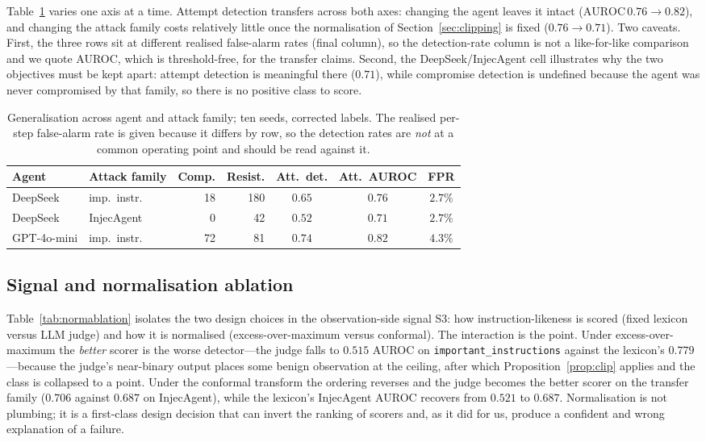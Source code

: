 \documentclass[preprint,12pt,authoryear]{elsarticle}
\theoremstyle{definition}
\begin{document}
Table~\ref{tab:generalisation} varies one axis at a time. Attempt detection
transfers across both axes: changing the agent leaves it intact
($\mathrm{AUROC}\,0.76 \to 0.82$), and changing the attack family costs
relatively little once the normalisation of Section~\ref{sec:clipping} is fixed
($0.76 \to 0.71$). Two caveats. First, the three rows sit at different realised
false-alarm rates (final column), so the detection-rate column is not a
like-for-like comparison and we quote AUROC, which is threshold-free, for the
transfer claims. Second, the DeepSeek/InjecAgent cell illustrates why the two
objectives must be kept apart: attempt detection is meaningful there ($0.71$),
while compromise detection is undefined because the agent was never compromised by
that family, so there is no positive class to score.

\begin{table}[t]
\centering
\caption{Generalisation across agent and attack family; ten seeds, corrected
labels. The realised per-step false-alarm rate is given because it differs by row,
so the detection rates are \emph{not} at a common operating point and should be
read against it.}
\label{tab:generalisation}
\small
\setlength{\tabcolsep}{4pt}
\begin{tabular}{@{}llrrccc@{}}
\toprule
Agent & Attack family & Comp. & Resist. & Att.\ det. & Att.\ AUROC & FPR \\
\midrule
DeepSeek & imp.\ instr. & 18 & 180 & $0.65$ & $0.76$ & $2.7\%$ \\
DeepSeek & InjecAgent & 0 & 42 & $0.52$ & $0.71$ & $2.7\%$ \\
GPT-4o-mini & imp.\ instr. & 72 & 81 & $0.74$ & $0.82$ & $4.3\%$ \\
\bottomrule
\end{tabular}
\end{table}

\subsection{Signal and normalisation ablation}\label{sec:ablation}

Table~\ref{tab:normablation} isolates the two design choices in the
observation-side signal S3: how instruction-likeness is scored (fixed lexicon
versus LLM judge) and how it is normalised (excess-over-maximum versus conformal).
The interaction is the point. Under excess-over-maximum the \emph{better} scorer is
the worse detector---the judge falls to $0.515$ AUROC on
\texttt{important\_instructions} against the lexicon's $0.779$---because the
judge's near-binary output places some benign observation at the ceiling, after
which Proposition~\ref{prop:clip} applies and the class is collapsed to a point.
Under the conformal transform the ordering reverses and the judge becomes the
better scorer on the transfer family ($0.706$ against $0.687$ on InjecAgent), while
the lexicon's InjecAgent AUROC recovers from $0.521$ to $0.687$. Normalisation is
not plumbing; it is a first-class design decision that can invert the ranking of
scorers and, as it did for us, produce a confident and wrong explanation of a
failure.
\end{document}
